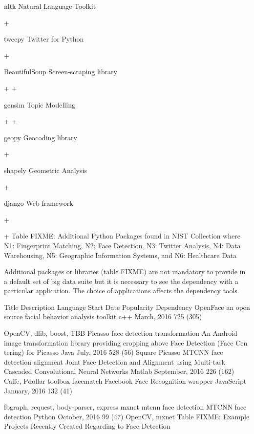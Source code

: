 \documentclass[9pt,twocolumn,twoside]{styles/osajnl}
\begin{document}
	 
	 
	 
	nltk
	Natural Language Toolkit
	 
	 
	+
	 
	 
	 
	tweepy
	Twitter for Python
	 
	 
	+
	 
	 
	 
	BeautifulSoup
	Screen-scraping library
	 
	 
	+
	+
	 
	 
	gensim
	Topic Modelling
	 
	 
	+
	+
	 
	 
	geopy
	Geocoding library
	 
	 
	 
	 
	+
	 
	shapely
	Geometric Analysis
	 
	 
	 
	 
	+
	 
	django
	Web framework
	 
	 
	 
	+
	 
	+
	Table FIXME: Additional Python Packages found in NIST
        Collection where N1: Fingerprint Matching, N2: Face Detection,
        N3: Twitter Analysis, N4: Data Warehousing, N5: Geographic
        Information Systems, and N6: Healthcare Data



Additional packages or libraries (table FIXME) are not mandatory to provide in a default set of big data suite but it is necessary to see the dependency with a particular application. The choice of applications affects the dependency tools.


Title
	Description
	Language
	Start Date
	Popularity
	Dependency
	OpenFace
	an  open  source  facial   behavior analysis toolkit
	c++
	March, 2016
	725 (305)

	OpenCV,                dlib,
boost, TBB
	Picasso  face
detection transformation
	An  Android  image   transformation library providing cropping above Face Detection (Face Cen tering) for Picasso
	Java
	July, 2016
	528 (56)
	Square Picasso
	MTCNN
face               detection alignment
	Joint Face Detection and Alignment using Multi-task Cascaded Convolutional Neural Networks
	Matlab
	September, 2016
	226 (162)
	Caffe,  Pdollar toolbox
	facematch
	Facebook Face           Recognition
wrapper
	JavaScript
	January, 2016
	132 (41)

	fbgraph,           request,
body-parser,             express
	mxnet mtcnn face detection
	MTCNN face detection
	Python
	October, 2016
	99 (47)
	OpenCV, mxnet
	Table FIXME: Example Projects Recently Created Regarding to Face Detection
\end{document}
